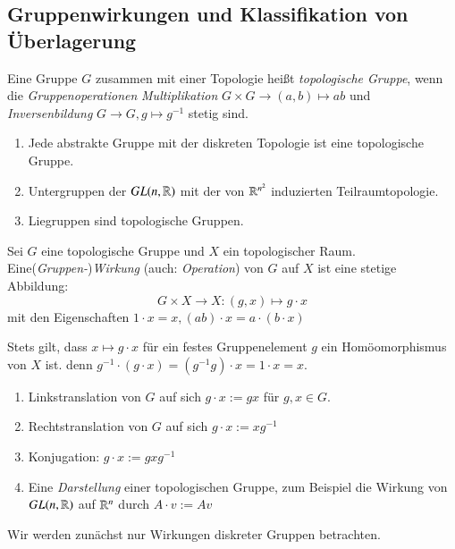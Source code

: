 \documentclass[a4paper,10pt]{scrartcl}
\begin{document}
\subsection{Gruppenwirkungen und Klassifikation von Überlagerung}
\begin{df}
 Eine Gruppe $G$ zusammen mit einer Topologie heißt \emph{topologische Gruppe}, wenn die \emph{Gruppenoperationen} \emph{Multiplikation} $G\times G \to (a,b)\mapsto ab$ und \emph{Inversenbildung}
$G\to G, g\mapsto g^{-1}$ stetig sind.
\end{df}
\begin{exs*}
 \begin{enumerate}[1)]
  \item Jede abstrakte Gruppe mit der diskreten Topologie ist eine topologische Gruppe.
  \item Untergruppen der $GL(n, \mathbb{R})$ mit der von $\mathbb{R}^{n^2}$ induzierten Teilraumtopologie.  
  \item Liegruppen sind topologische Gruppen.
 \end{enumerate}
\end{exs*}
\begin{df}\label{thm2:3.2}
 Sei $G$ eine topologische Gruppe und $X$ ein topologischer Raum. Eine(\emph{Gruppen-})\emph{Wirkung} (auch: \emph{Operation}) von $G$ auf $X$ ist eine stetige Abbildung:
\[
 G\times X\to X: (g,x) \mapsto g\cdot x
\]
mit den Eigenschaften $1\cdot x = x, (ab)\cdot x=a\cdot (b\cdot x)$
\end{df}
\begin{note*}
 Stets gilt, dass $x\mapsto g\cdot x$ für ein festes Gruppenelement $g$ ein Homöomorphismus von $X$ ist. denn $g^{-1} \cdot (g\cdot x)=(g^{-1}g)\cdot x=1\cdot x=x.$
\end{note*}
\begin{exs*}
 \begin{enumerate}[1)]
  \item Linkstranslation von $G$ auf sich $g\cdot x:=gx$ für $g,x\in G$.
  \item Rechtstranslation von $G$ auf sich $g\cdot x:=xg^{-1}$
  \item Konjugation: $g \cdot x := gxg^{-1}$
  \item Eine \emph{Darstellung} einer topologischen Gruppe, zum Beispiel die Wirkung von $GL(n, \mathbb{R})$ auf $\mathbb{R}^n$ durch $A \cdot v := Av$
 \end{enumerate}
\end{exs*}
Wir werden zunächst nur Wirkungen diskreter Gruppen betrachten.
\end{document}
